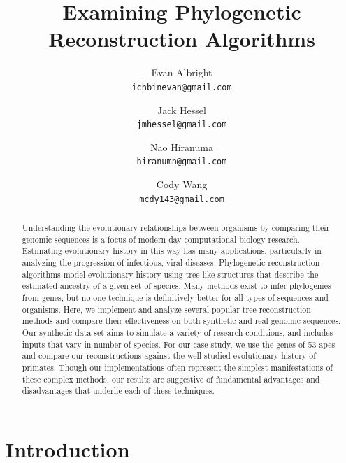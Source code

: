 \documentclass[10pt,twocolumn]{article}
\begin{document}
\title{Examining Phylogenetic Reconstruction Algorithms}

\author{
Evan Albright\\
\texttt{ichbinevan@gmail.com}
\and
Jack Hessel\\
\texttt{jmhessel@gmail.com}
\and
Nao Hiranuma\\
\texttt{hiranumn@gmail.com}
\and
Cody Wang\\
\texttt{mcdy143@gmail.com}
}

\maketitle
\thispagestyle{empty}

\begin{abstract}
Understanding the evolutionary relationships between organisms by comparing their genomic sequences
is a focus of modern-day computational biology research. Estimating evolutionary history in this way 
has many applications, particularly in analyzing
the progression of infectious, viral diseases. Phylogenetic reconstruction algorithms model
evolutionary history using tree-like structures that describe the estimated ancestry of a given set
of species. Many methods exist to infer phylogenies from genes, but no one technique is
definitively better for all types of sequences and organisms. Here, we implement and analyze
several popular tree reconstruction methods and compare their effectiveness on both synthetic
and real genomic sequences. Our synthetic data set aims to simulate a variety of research
conditions, and includes inputs that vary in number of species. For our case-study, we use the genes of 53 apes and compare our reconstructions
against the well-studied evolutionary history of primates. Though our implementations often
represent the simplest manifestations of these complex methods, our results are suggestive of
fundamental advantages and disadvantages that underlie each of these techniques.
\end{abstract}

\section*{Introduction}
\end{document}
